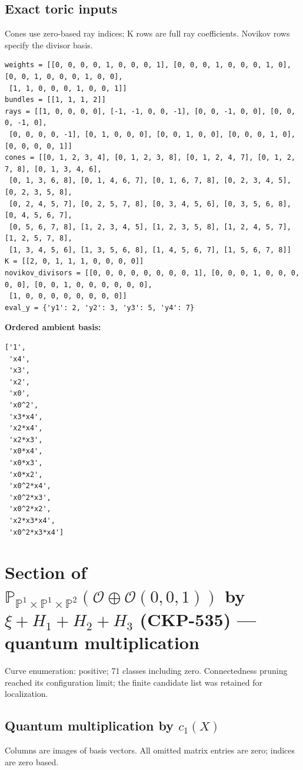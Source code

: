 \documentclass[10pt,a4paper]{article}
\begin{document}
\subsection*{Exact toric inputs}
Cones use zero-based ray indices; K rows are full ray coefficients. Novikov rows specify the divisor basis.

\begin{lstlisting}
weights = [[0, 0, 0, 0, 1, 0, 0, 0, 1], [0, 0, 0, 1, 0, 0, 0, 1, 0], [0, 0, 1, 0, 0, 0, 1, 0, 0],
 [1, 1, 0, 0, 0, 1, 0, 0, 1]]
bundles = [[1, 1, 1, 2]]
rays = [[1, 0, 0, 0, 0], [-1, -1, 0, 0, -1], [0, 0, -1, 0, 0], [0, 0, 0, -1, 0],
 [0, 0, 0, 0, -1], [0, 1, 0, 0, 0], [0, 0, 1, 0, 0], [0, 0, 0, 1, 0], [0, 0, 0, 0, 1]]
cones = [[0, 1, 2, 3, 4], [0, 1, 2, 3, 8], [0, 1, 2, 4, 7], [0, 1, 2, 7, 8], [0, 1, 3, 4, 6],
 [0, 1, 3, 6, 8], [0, 1, 4, 6, 7], [0, 1, 6, 7, 8], [0, 2, 3, 4, 5], [0, 2, 3, 5, 8],
 [0, 2, 4, 5, 7], [0, 2, 5, 7, 8], [0, 3, 4, 5, 6], [0, 3, 5, 6, 8], [0, 4, 5, 6, 7],
 [0, 5, 6, 7, 8], [1, 2, 3, 4, 5], [1, 2, 3, 5, 8], [1, 2, 4, 5, 7], [1, 2, 5, 7, 8],
 [1, 3, 4, 5, 6], [1, 3, 5, 6, 8], [1, 4, 5, 6, 7], [1, 5, 6, 7, 8]]
K = [[2, 0, 1, 1, 1, 0, 0, 0, 0]]
novikov_divisors = [[0, 0, 0, 0, 0, 0, 0, 0, 1], [0, 0, 0, 1, 0, 0, 0, 0, 0], [0, 0, 1, 0, 0, 0, 0, 0, 0],
 [1, 0, 0, 0, 0, 0, 0, 0, 0]]
eval_y = {'y1': 2, 'y2': 3, 'y3': 5, 'y4': 7}
\end{lstlisting}

\textbf{Ordered ambient basis:}
\begin{lstlisting}
['1',
 'x4',
 'x3',
 'x2',
 'x0',
 'x0^2',
 'x3*x4',
 'x2*x4',
 'x2*x3',
 'x0*x4',
 'x0*x3',
 'x0*x2',
 'x0^2*x4',
 'x0^2*x3',
 'x0^2*x2',
 'x2*x3*x4',
 'x0^2*x3*x4']
\end{lstlisting}

\clearpage\section*{Section of $\mathbb P_{\mathbb P^{1}\times \mathbb P^{1}\times \mathbb P^{2}}(\mathcal O\oplus \mathcal O(0,0,1))$ by $\xi +H_{1}+H_{2}+H_{3}$ (CKP-535) --- quantum multiplication}

Curve enumeration: positive; 71 classes including zero.
Connectedness pruning reached its configuration limit; the finite candidate list was retained for localization.
\subsection*{Quantum multiplication by $c_1(X)$}
Columns are images of basis vectors. All omitted matrix entries are zero; indices are zero based.
\end{document}
